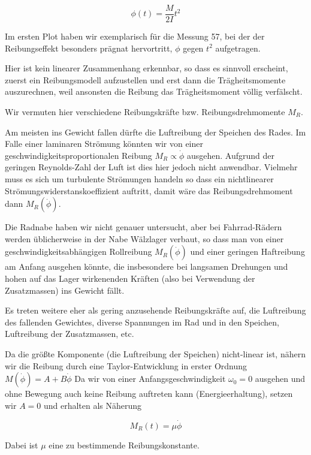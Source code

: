 \documentclass[a4paper,german,12pt,smallheadings]{scrartcl}
\begin{document}
\begin{equation}
  \phi(t) = \frac{M}{2I} t^2
\end{equation}

Im ersten Plot haben wir exemplarisch für die Messung 57, bei der der Reibungseffekt
besonders prägnat hervortritt, $\phi$ gegen $t^2$ aufgetragen.

Hier ist kein linearer Zusammenhang erkennbar, so dass es sinnvoll erscheint,
zuerst ein Reibungsmodell aufzustellen und erst dann die Trägheitsmomente
auszurechnen, weil ansonsten die Reibung das Trägheitsmoment völlig verfälscht.

Wir vermuten hier verschiedene Reibungskräfte bzw. Reibungsdrehmomente $M_R$.

Am meisten ins Gewicht fallen dürfte die Luftreibung der Speichen des Rades. Im
Falle einer laminaren Strömung könnten wir von einer
geschwindigkeitsproportionalen Reibung $M_R \propto \dot{\phi}$ ausgehen.
Aufgrund der geringen Reynolds-Zahl der Luft ist dies hier jedoch nicht
anwendbar. Vielmehr muss es sich um turbulente Strömungen handeln so dass ein
nichtlinearer Strömungswiderstanskoeffizient auftritt, damit wäre das
Reibungsdrehmoment dann $M_R(\dot{\phi})$.

Die Radnabe haben wir nicht genauer untersucht, aber bei Fahrrad-Rädern werden
üblicherweise in der Nabe Wälzlager verbaut, so dass man von einer
geschwindigkeitsabhängigen Rollreibung $M_R(\dot{\phi})$ und einer geringen
Haftreibung am Anfang ausgehen könnte, die insbesondere bei langsamen Drehungen
und hohen auf das Lager wirkenenden Kräften (also bei Verwendung der
Zusatzmassen) ins Gewicht fällt.

Es treten weitere eher als gering anzusehende Reibungskräfte auf, die
Luftreibung des fallenden Gewichtes, diverse Spannungen im Rad und in den
Speichen, Luftreibung der Zusatzmassen, etc.

Da die größte Komponente (die Luftreibung der Speichen) nicht-linear ist,
nähern wir die Reibung durch eine Taylor-Entwicklung in erster Ordnung $
M(\dot{\phi}) = A + B \dot{\phi}$
Da wir von einer Anfangsgeschwindigkeit $\omega_0=0$ ausgehen und ohne Bewegung
auch keine Reibung auftreten kann (Energieerhaltung), setzen wir $A=0$ und
erhalten als Näherung

\begin{equation}
  M_R(t) = \mu \dot{\phi}
\end{equation}

Dabei ist $\mu$ eine zu bestimmende Reibungskonstante.
\end{document}
